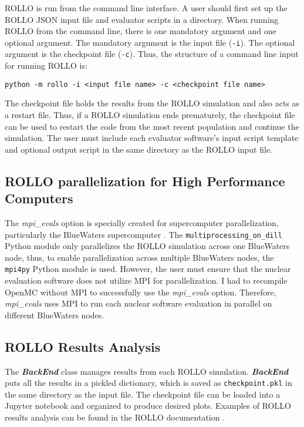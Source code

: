 \gls{ROLLO} is run from the command line interface. 
A user should first set up the \gls{ROLLO} JSON input file and evaluator 
scripts in a directory. 
When running \gls{ROLLO} from the command line, there is one mandatory argument and 
one optional argument. 
The mandatory argument is the input file (\texttt{-i}). 
The optional argument is the checkpoint file (\texttt{-c}).  
Thus, the structure of a command line input for running \gls{ROLLO} is: 

\noindent
\texttt{python -m rollo -i <input file name> -c <checkpoint file name>}

The checkpoint file holds the results from the \gls{ROLLO} simulation and also acts 
as a restart file. 
Thus, if a \gls{ROLLO} simulation ends prematurely, the checkpoint file can be used 
to restart the code from the most recent population and continue the simulation. 
The user must include each evaluator software's input script template 
and optional output script in the same directory as the \gls{ROLLO} input file. 

\subsection{ROLLO parallelization for High Performance Computers}
\label{sec:rollo_parallel}
The \textit{mpi\_evals} option is specially created for supercomputer 
parallelization, particularly the BlueWaters supercomputer \cite{ncsa_about_2017}.
The \texttt{multiprocessing\_on\_dill} Python module only parallelizes the \gls{ROLLO}
simulation across one BlueWaters node, thus, to enable parallelization across 
multiple BlueWaters nodes, the \texttt{mpi4py} Python module is used. 
However, the user must ensure that the nuclear evaluation software does not 
utilize MPI for parallelization. 
I had to recompile OpenMC without MPI to successfully use the 
\textit{mpi\_evals} option.
Therefore, \textit{mpi\_evals} uses MPI to run each nuclear software evaluation
in parallel on different BlueWaters nodes. 

\subsection{\gls{ROLLO} Results Analysis}
The \textbf{\textit{BackEnd}} class manages results from each \gls{ROLLO} simulation. 
\textbf{\textit{BackEnd}} puts all the results in a pickled dictionary, which 
is saved as \texttt{checkpoint.pkl} in the same directory as the input file. 
The checkpoint file can be loaded into a Jupyter notebook and organized 
to produce desired plots. 
Examples of \gls{ROLLO} results analysis can be found in the \gls{ROLLO} documentation 
\cite{chee_documentation_2021}. 

